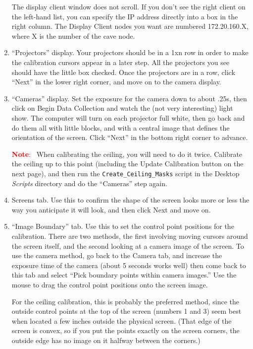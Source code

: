 \documentclass[11pt]{article}
\newenvironment{note}[1][Note]{\begin{lrbox}{\notebox}%
    \begin{minipage}{0.9\columnwidth}\textcolor{red}{\textbf{#1}:~}}%
    {\end{minipage}\end{lrbox}\begin{center}\setlength{\fboxsep}{8pt}%
    \fbox{\usebox{\notebox}}\end{center}}
\newcommand{\cmd}[1]{\texttt{#1}\xspace}
\newcommand{\dir}[1]{\textit{#1}\xspace}
\newcommand{\menu}[1]{``#1''\xspace}
\newcommand{\button}[1]{\textsf{#1}\xspace}
\begin{document}
\begin{enumerate}
The display client window does not scroll.  If you don't see the right
client on the left-hand list, you can specify the IP address directly
into a box in the right column.  The Display Client nodes you want are
numbered 172.20.160.X, where X is the number of the cave node.

\item \menu{Projectors} display.  Your projectors should be in a 1xn row in
  order to make the calibration cursors appear in a later step.  All
  the projectors you see should have the little box checked.  Once the
  projectors are in a row, click
  \menu{Next} in the lower right corner, and move on to the camera
  display.

\item \menu{Cameras} display.  Set the exposure for the camera down to about
  .25s, then click on {Begin Data Collection} and watch the (not very
  interesting) light show.  The computer will turn on each projector
  full white, then go back and do them all with little blocks, and
  with a central image that defines the orientation of the
  screen.  Click ``Next'' in the bottom right corner to advance.

\begin{note}
  When calibrating the ceiling, you will need to do it twice.
  Calibrate the ceiling up to this point (including the \button{Update
    Calibration} button on the next page), and then run the
  \cmd{Create\_Ceiling\_Masks} script in the Desktop \dir{Scripts}
  directory and do the \menu{Cameras} step again.
\end{note}

\item Screens tab.  Use this to confirm the shape of the screen looks
  more or less the way you anticipate it will look, and then click
  \button{Next} and move on.

\item \menu{Image Boundary} tab.  Use this to set the control point
  positions for the calibration.  There are two methods, the first
  involving moving cursors around the screen itself, and the second
  looking at a camera image of the screen.  To use the camera method,
  go back to the Camera tab, and increase the exposure time of the
  camera (about 5 seconds works well) then come back to this tab and
  select ``Pick boundary points within camera images.''  Use the mouse
  to drag the control point positions onto the screen image.

  For the ceiling calibration, this is probably the preferred method,
  since the outside control points at the top of the screen (numbers 1
  and 3) seem best when located a few inches outside the physical
  screen.  (That edge of the screen is convex, so if you put the
  points exactly on the screen corners, the outside edge has no image
  on it halfway between the corners.)


\end{enumerate}
\end{document}
